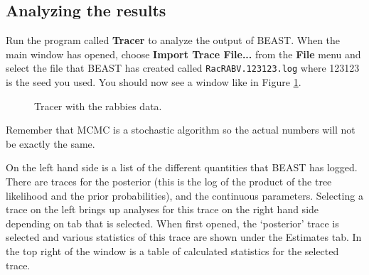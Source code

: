 \documentclass{article}
\begin{document}
\subsection*{Analyzing the results}

Run the program called {\bf Tracer} to analyze the output of BEAST. When the main
window has opened, choose {\bf Import Trace File...} from the {\bf File} menu and select the file that
BEAST has created called \texttt{RacRABV.123123.log} where 123123 is the seed you used.
You should now see a window like in Figure \ref{fig.tracer1}.

\begin{figure}
\begin{center}


\end{center}
\caption{\label{fig.tracer1} Tracer with the rabbies data.}
\end{figure}


Remember that MCMC is a stochastic algorithm so the actual numbers will not be exactly the same.

On the left hand side is a list of the different quantities that BEAST has logged. There are traces for the posterior (this
is the log of the product of the tree likelihood and the prior probabilities), and the continuous parameters. Selecting a trace
on the left brings up analyses for this trace on the right hand side depending on tab that is selected. When first opened, the
`posterior' trace is selected and various statistics of this trace are shown under the Estimates tab.
In the top right of the window is a table of calculated statistics for the selected trace. 
\end{document}
